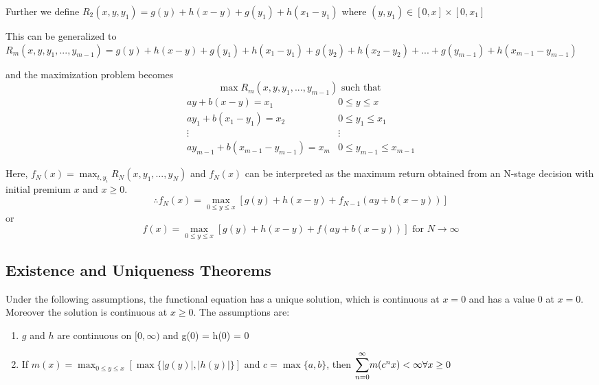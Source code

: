 Further we define $R_2(x, y, y_1) = g(y) + h(x-y) + g(y_1) + h(x_1-y_1)$ where $(y, y_1) \in [0, x] \times [0, x_1]$

\vspace{5mm}
This can be generalized to $R_m(x, y, y_1, ..., y_{m-1}) = g(y) + h(x-y) + g(y_1) + h(x_1-y_1) + g(y_2) + h(x_2-y_2) + ... + g(y_{m-1}) + h(x_{m-1} - y_{m-1})$

and the maximization problem becomes
\[
\max R_m(x, y, y_1, ..., y_{m-1}) \text{ such that }
\]
\[ 
\begin{array}{ll}
    ay+b(x-y) = x_1 & 0 \le y \le x \\
    ay_1+b(x_1-y_1) = x_2 & 0 \le y_1 \le x_1 \\
    \vdots & \vdots\\
    ay_{m-1}+b(x_{m-1}-y_{m-1}) = x_m & 0 \le y_{m-1} \le x_{m-1}
\end{array}
\]

Here, $f_N(x) = \max_{t, y_i} R_N(x, y_1, ..., y_N)$ and $f_N(x)$ can be interpreted as the maximum return obtained from an N-stage decision with initial premium $x$ and $x \ge 0$.
$$
\therefore f_N(x) = \max_{0 \le y \le x} [g(y) + h(x-y) + f_{N-1}(ay+b(x-y))]
$$
or 
$$
f(x) = \max_{0 \le y \le x} [g(y) + h(x-y) + f(ay+b(x-y))] \text{ for } N \rightarrow \infty
$$

\subsection{Existence and Uniqueness Theorems}
Under the following assumptions, the functional equation has a unique solution, which is continuous at $x=0$ and has a value 0 at $x=0$. Moreover the solution is continuous at $x \ge 0$.
\newpage
The assumptions are:
\begin{enumerate}
    \item $g$ and $h$ are continuous on $[0, \infty)$ and g(0) = h(0) = 0
    \item If $m(x) = \max_{0 \le y \le x} [\max\{|g(y)|, |h(y)|\}]$ and $c = \max \{a, b\}$, then $\bigsum_{n=0}^{\infty} m(c^nx) < \infty \forall x \ge 0$
\end{enumerate}

